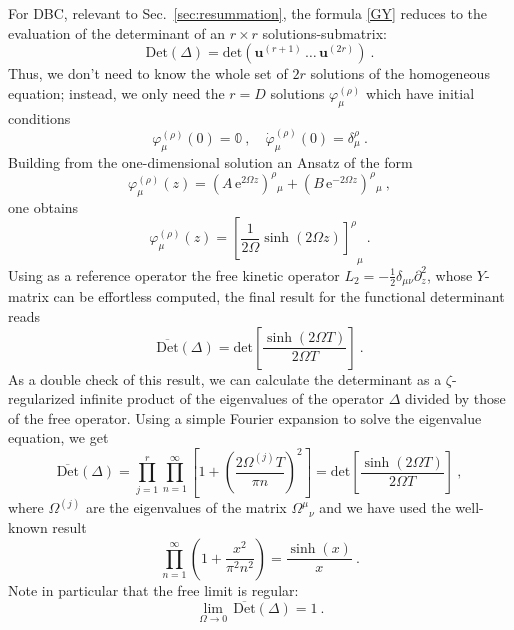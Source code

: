 \documentclass[12pt,a4paper]{article}
\numberwithin{equation}{section}
\numberwithin{equation}{section}
\begin{document}
For DBC, relevant to Sec.~\ref{sec:resummation}, the formula \eqref{GY} reduces to the evaluation of the determinant of an $r \times r$ solutions-submatrix:
\begin{equation}
\mathrm{Det}(\Delta)=\mathrm{det}(\mathbf{u}^{(r+1)} \, \dots \, \mathbf{u}^{(2r)})\ .
\end{equation}
Thus, we don't need to know the whole set of $2r$ solutions of the homogeneous equation; instead, we only need the $r=D$ solutions $\varphi_\mu^{(\rho)}$ which have initial conditions
\begin{equation}
\varphi_\mu^{(\rho)}(0)=\mathbb{0}\ , \quad \dot{\varphi}_\mu^{(\rho)}(0)=\delta^\rho_\mu\ .
\end{equation}
Building from the one-dimensional solution an Ansatz of the form
\begin{equation}
\varphi_\mu^{(\rho)}(z)=\left(A \, \mathrm{e}^{2\Omega z} \right)^\rho{}_\mu+\left(B \, \mathrm{e}^{-2\Omega z} \right)^\rho{}_\mu\ ,
\end{equation}
one obtains
\begin{equation}
\varphi_\mu^{(\rho)}(z)=\left[ \left.\frac{1}{2\Omega}\sinh(2\Omega z) \right]^\rho{}\right._\mu\ .
\end{equation}
Using as a reference operator the free kinetic operator $L_2=-\tfrac12\delta_{\mu\nu}\partial^2_z$, whose $Y$-matrix can be effortless computed, the final result for the functional determinant reads
\begin{equation}
{\overline{\mathrm{Det}}(\Delta)=\mathrm{det}\left[ \frac{\sinh(2\Omega T)}{2\Omega T} \right]}\ .
\end{equation}
As a double check of this result, we can calculate the determinant as a $\zeta$-regularized infinite product of the eigenvalues of the operator $\Delta$ divided by those of the free operator. Using a simple Fourier expansion to solve the eigenvalue equation, we get
\begin{equation}
 \overline{\mathrm{Det}}(\Delta)= \prod_{j=1}^{r} \prod\limits_{n =1}^{\infty} \left[ 1+\left(\frac{2\Omega^{(j)} T}{\pi n}\right)^2\right] =\mathrm{det}\left[ 
\frac{\sinh{(2\Omega T)}}{2\Omega T} \right]\ ,
\end{equation}
where $\Omega^{(j)}$ are the eigenvalues of the matrix $\Omega^{\mu}{}_{\nu}$ and we have used the well-known result
\begin{equation}
 \prod\limits_{n=1}^{\infty}\left( 1+\frac{x^2}{\pi^2n^2} \right)=\frac{\sinh{(x)}}{x}\ .
\end{equation}
Note in particular that the free limit is regular:
\begin{equation}
 \lim_{\Omega\to0} \, \overline{\mathrm{Det}}(\Delta)=1\ .
\end{equation}
\end{document}
